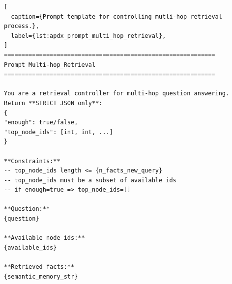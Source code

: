 \begin{lstlisting}[
  caption={Prompt template for controlling mutli-hop retrieval process.},
  label={lst:apdx_prompt_multi_hop_retrieval},
]
============================================================
Prompt Multi-hop_Retrieval
============================================================

You are a retrieval controller for multi-hop question answering.
Return **STRICT JSON only**:
{
"enough": true/false,
"top_node_ids": [int, int, ...]
}

**Constraints:**
-- top_node_ids length <= {n_facts_new_query}
-- top_node_ids must be a subset of available ids
-- if enough=true => top_node_ids=[]

**Question:**
{question}

**Available node ids:**
{available_ids}

**Retrieved facts:**
{semantic_memory_str}

\end{lstlisting}
